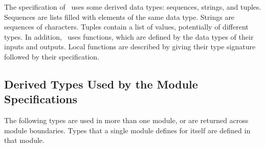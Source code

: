 \documentclass[12pt, titlepage]{article}
\begin{document}
The specification of \progname\ uses some derived data types: sequences, strings, and
tuples. Sequences are lists filled with elements of the same data type. Strings
are sequences of characters. Tuples contain a list of values, potentially of
different types. In addition, \progname\ uses functions, which
are defined by the data types of their inputs and outputs. Local functions are
described by giving their type signature followed by their specification.

\subsection*{Derived Types Used by the Module Specifications}
The following types are used in more than one module, or are returned across module boundaries. Types that a single module defines for itself are defined in that module.
\end{document}
